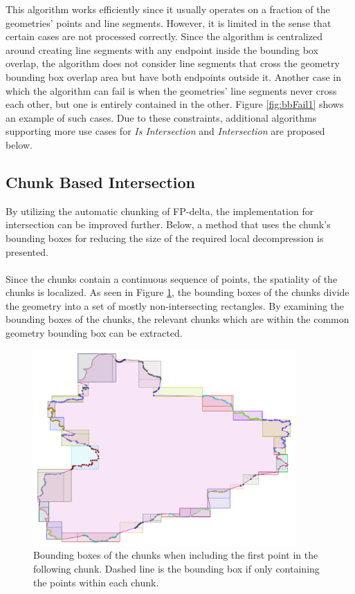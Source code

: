 This algorithm works efficiently since it usually operates on a fraction of the geometries' points and line segments. However, it is limited in the sense that certain cases are not processed correctly. Since the algorithm is centralized around creating line segments with any endpoint inside the bounding box overlap, the algorithm does not consider line segments that cross the geometry bounding box overlap area but have both endpoints outside it. Another case in which the algorithm can fail is when the geometries' line segments never cross each other, but one is entirely contained in the other. Figure \ref{fig:bbFail1} shows an example of such cases. Due to these constraints, additional algorithms supporting more use cases for \textit{Is Intersection} and \textit{Intersection} are proposed below.





\subsection{Chunk Based Intersection}
\label{sect:chkintersect}
By utilizing the automatic chunking of FP-delta, the implementation for intersection can be improved further. Below, a method that uses the chunk's bounding boxes for reducing the size of the required local decompression is presented.
\\\\
Since the chunks contain a continuous sequence of points, the spatiality of the chunks is localized. As seen in Figure \ref{fig:chunks}, the bounding boxes of the chunks divide the geometry into a set of mostly non-intersecting rectangles. By examining the bounding boxes of the chunks, the relevant chunks which are within the common geometry bounding box can be extracted.

\begin{figure}[htbp]
    \centering
    \includegraphics[width=10cm]{images/chunks.png}
    \caption{Bounding boxes of the chunks when including the first point in the following chunk. Dashed line is the bounding box if only containing the points within each chunk.}
    \label{fig:chunks}
\end{figure}

